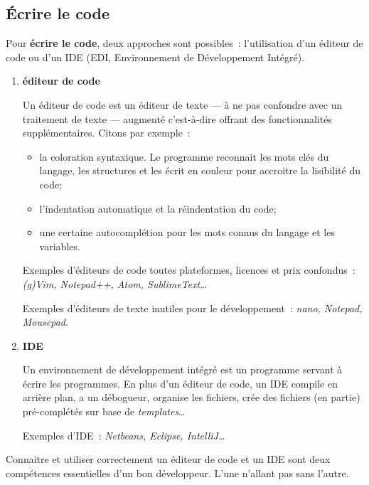 \subsection{Écrire le code}

Pour \textbf{écrire le code}, deux approches sont possibles~: l'utilisation 
d'un éditeur de code ou d'un IDE (EDI, Environnement de Développement Intégré).

\begin{enumerate}
	\item \textbf{éditeur de code}

		Un éditeur de code est un éditeur de texte — à ne pas confondre avec un
		traitement de texte — augmenté c'est-à-dire offrant des fonctionnalités
		supplémentaires. Citons par exemple~:

		\begin{itemize}

			\item la coloration syntaxique. Le programme reconnait les mots clés
				du langage, les structures et les écrit en couleur pour
				accroitre la lisibilité du code;

			\item l'indentation automatique et la réindentation du code;

			\item une certaine autocomplétion pour les mots connus du langage 
				et les variables.

		\end{itemize}

		Exemples d'éditeurs de code toutes plateformes, licences et prix
		confondus~: {\itshape (g)Vim, Notepad++, Atom, SublimeText…}
	
		Exemples d'éditeurs de texte inutiles pour le développement~: {\itshape
		nano, Notepad, Mousepad}.


	\item \textbf{IDE}

		Un environnement de développement intégré est un programme servant à 
		écrire les programmes. En plus d'un éditeur de code, un IDE compile 
		en arrière plan, a un débogueur, organise les fichiers, crée des fichiers
		(en partie) pré-complétés sur base de \textit{templates}…

		Exemples d'IDE~: {\itshape Netbeans, Eclipse, IntelliJ… }

\end{enumerate}

Connaitre et utiliser correctement un éditeur de code et un IDE sont deux
compétences essentielles d'un bon développeur. L'une n'allant pas sans l'autre. 

